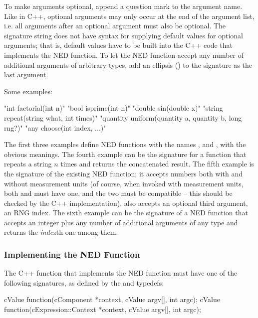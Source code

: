 To make arguments optional, append a question mark to the argument name.
Like in C++, optional arguments may only occur at the end of the argument
list, i.e. all arguments after an optional argument must also be optional.
The signature string does not have syntax for supplying default values for
optional arguments; that is, default values have to be built into the C++
code that implements the NED function. To let the NED function accept any
number of additional arguments of arbitrary types, add an ellipsis
() to the signature as the last argument.

Some examples:

\begin{cpp}
"int factorial(int n)"
"bool isprime(int n)"
"double sin(double x)"
"string repeat(string what, int times)"
"quantity uniform(quantity a, quantity b, long rng?)"
"any choose(int index, ...)"
\end{cpp}

The first three examples define NED functions with the names ,
 and , with the obvious meanings. The fourth example
can be the signature for a function that repeats a string $n$ times and
returns the concatenated result. The fifth example is the signature of the
existing  NED function; it accepts numbers both with and without
measurement units (of course, when invoked with measurement units, both 
and  must have one, and the two must be compatible -- this should be checked
by the C++ implementation).  also accepts an optional third argument,
an RNG index. The sixth example can be the signature of a 
NED function that accepts an integer plus any number of additional arguments
of any type and returns the \textit{index}th one among them.

\subsubsection{Implementing the NED Function}
\label{sec:sim-lib:implementing-ned-function}

The C++ function that implements the NED function must have one of the following
signatures, as defined by the  and  typedefs:

\begin{cpp}
cValue function(cComponent *context, cValue argv[], int argc);
cValue function(cExpression::Context *context, cValue argv[], int argc);
\end{cpp}


